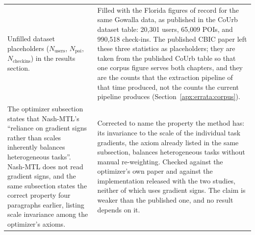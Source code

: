 \begin{table}[htb]
\begin{tabular}{@{}p{}p{}@{}}
Unfilled dataset placeholders ($N_{\text{users}}$, $N_{\text{poi}}$,
$N_{\text{checkins}}$) in the results section. &
Filled with the Florida figures of record for the same Gowalla data, as published in the
CoUrb dataset table: 20{,}301 users, 65{,}009 POIs, and 990{,}518 check-ins. The published
CBIC paper left these three statistics as placeholders; they are taken from the published
CoUrb table so that one corpus figure serves both chapters, and they are the counts that the
extraction pipeline of that time produced, not the counts the current pipeline produces
(Section~\ref{apx:errata:corpus}). \\
\addlinespace
The optimizer subsection states that Nash-MTL's ``reliance on gradient signs rather than
scales inherently balances heterogeneous tasks''. Nash-MTL does not read gradient signs,
and the same subsection states the correct property four paragraphs earlier, listing
scale invariance among the optimizer's axioms. &
Corrected to name the property the method has: its invariance to the scale of the
individual task gradients, the axiom already listed in the same subsection, balances
heterogeneous tasks without manual re-weighting. Checked against the optimizer's own
paper and against the implementation released with the two studies, neither of which
uses gradient signs. The claim is weaker than the published one, and no result depends
on it. \\
\bottomrule
\end{tabular}
\end{table}
